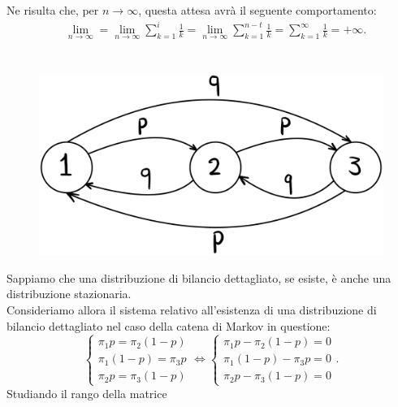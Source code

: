 \documentclass[12pt]{homework}
\begin{document}
Ne risulta che, per $n\rightarrow\infty$, questa attesa avrà il seguente comportamento:
\begin{align*}
&\lim \limits_{n\rightarrow \infty} =\lim\limits_{n\rightarrow \infty}\sum_{k=1}^{i}\frac{1}{k}=
\lim\limits_{n\rightarrow \infty} \sum_{k=1}^{n-t}\frac{1}{k}=\sum_{k=1}^{\infty}\frac{1}{k}=+\infty.
\end{align*}




\newpage
\section{}%
 \begin{figure}[htb]\centering
\includegraphics[scale=0.09]{Catena4.eps}
  \end{figure}
  Sappiamo che una distribuzione di bilancio dettagliato, se esiste, è anche una distribuzione stazionaria.\\
  Consideriamo allora il sistema relativo all'esistenza di una distribuzione di bilancio dettagliato nel caso della catena di Markov in questione:
  \begin{equation*}
  \begin{cases}\pi_{1}p=\pi_{2}\left(1-p\right)\\\pi_{1}\left(1-p\right)=\pi_{3}p\\\pi_{2}p=\pi_{3}\left(1-p\right)\end{cases}\Leftrightarrow\begin{cases}\pi_{1}p-\pi_{2}\left(1-p\right)=0\\\pi_{1}\left(1-p\right)-\pi_{3}p=0\\\pi_{2}p-\pi_{3}\left(1-p\right)=0\end{cases}.
  \end{equation*}
  Studiando il rango della matrice
\end{document}
